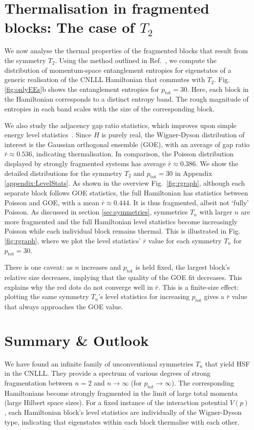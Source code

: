 \documentclass[aps,prx,10pt,twocolumn,amsmath,amssymb,superscriptaddress]{revtex4-2}
\newcommand{\ptot}{p_{\mathrm{tot}}}
\theoremstyle{definition}
\theoremstyle{definition}
\begin{document}
\section{Thermalisation in fragmented blocks: The case of $T_2$} \label{sec:entropyandlvlstats}

We now analyse the thermal properties of the fragmented blocks that result from the symmetry $T_2$.
Using the method outlined in Ref.~, we compute the distribution of momentum-space entanglement entropies for eigenstates of a generic realisation of the CNLLL Hamiltonian that commutes with $T_2$. Fig. \ref{fig:onlyEEs}b shows the entanglement entropies for $\ptot = 30$. Here, each block in the Hamiltonian corresponds to a distinct entropy band. The rough magnitude of entropies in each band scales with the size of the corresponding block. 

We also study the adjacency gap ratio statistics, which improves upon simple energy level statistics~\cite{LevelSpacingStats}.
Since ${H}$ is purely real, the Wigner-Dyson distribution of interest is the Gaussian orthogonal ensemble (GOE), with an average of gap ratio $\bar{r} \approx 0.536$, indicating thermalisation. 
In comparison, the Poisson distribution displayed by strongly fragmented systems has average $\bar{r} \approx 0.386$. We show the detailed distributions for the symmetry $T_2$ and $\ptot = 30$ in Appendix \ref{appendix:LevelStats}. As shown in the overview Fig.~\ref{fig:rgraph}, although each separate block follows GOE statistics, the full Hamiltonian has statistics between Poisson and GOE, with a mean $\bar{r} \approx 0.444$. It is thus fragmented, albeit not `fully' Poisson. As discussed in section \ref{sec:symmetries}, symmetries $T_n$ with larger $n$ are more fragmented and the full Hamiltonian level statistics become increasingly Poisson while each individual block remains thermal. This is illustrated in Fig. \ref{fig:rgraph}, where we plot the level statistics' $\bar{r}$ value for each symmetry $T_n$ for $\ptot=30$.

There is one caveat: as $n$ increases and $\ptot$ is held fixed, the largest block's relative size decreases, implying that the quality of the GOE fit decreases. This explains why the red dots do not converge well in $\bar{r}$. This is a finite-size effect: plotting the same symmetry $T_n$'s level statistics for increasing $\ptot$ gives a $\bar{r}$ value that always approaches the GOE value.

\section{Summary \& Outlook}
\label{sec:conclusion}
We have found an infinite family of unconventional symmetries $T_n$ that yield HSF in the CNLLL. They provide a spectrum of various degrees of strong fragmentation between $n=2$ and $n \to \infty$ (for $\ptot \to \infty$). The corresponding Hamiltonians become strongly fragmented in the limit of large total momenta (large Hilbert space sizes). For a fixed instance of the interaction potential $V(p)$, each Hamiltonian block's level statistics are individually of the Wigner-Dyson type, indicating that eigenstates within each block thermalise with each other.
\end{document}
